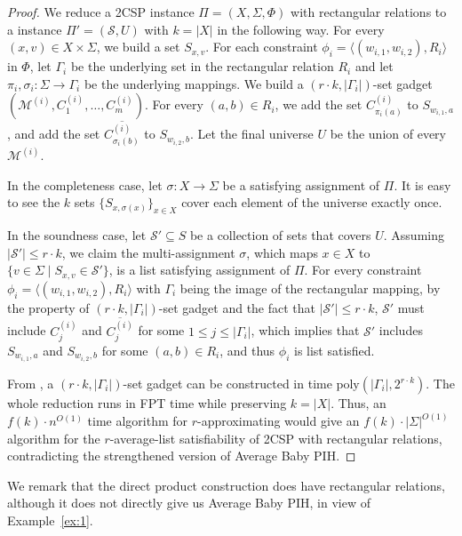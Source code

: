 \begin{proof}
We reduce a 2CSP instance $\Pi=(X,\Sigma,\Phi)$ with rectangular relations to a \ksetcover{} instance $\Pi'=(\mathcal S,U)$ with $k=|X|$ in the following way. For every $(x,v) \in X \times \Sigma$, we build a set $S_{x,v}$. For each constraint $\phi_i=\langle (w_{i,1},w_{i,2}),R_i\rangle$ in $\Phi$, let $\Gamma_i$ be the underlying set in the rectangular relation $R_i$ and let $\pi_i,\sigma_i:\Sigma\to \Gamma_i$ be the underlying mappings. We build a $(r \cdot k,|\Gamma_i|)$-set gadget $(\mathcal M^{(i)},C_1^{(i)},\ldots,C_m^{(i)})$. For every $(a,b) \in R_i$, we add the set $C_{\pi_i(a)}^{(i)}$ to $S_{w_{i,1},a}$, and add the set $\overline{C_{\sigma_i(b)}^{(i)}}$ to $S_{w_{i,2},b}$. Let the final universe $U$ be the union of every $\mathcal M^{(i)}$.


In the completeness case, let $\sigma:X \to \Sigma$ be a satisfying assignment of $\Pi$. It is easy to see the $k$ sets $\{S_{x,\sigma(x)}\}_{x \in X}$ cover each element of the universe exactly once.

In the soundness case, let $\mathcal S' \subseteq S$ be a collection of sets that covers $U$. Assuming $|\mathcal S'| \le r \cdot k$, we claim the multi-assignment $\sigma$, which maps $x \in X$ to $\{v \in \Sigma \mid S_{x,v} \in \mathcal S'\}$, is a list satisfying assignment of $\Pi$. For every constraint $\phi_i=\langle (w_{i,1},w_{i,2}),R_i\rangle$ with $\Gamma_i$ being the image of the rectangular mapping, by the property of $(r\cdot k,|\Gamma_i|)$-set gadget and the fact that $|\mathcal S'|\le r \cdot k$, $\mathcal S'$ must include $C_{j}^{(i)}$ and $\overline{C_j^{(i)}}$ for some $1 \le j \le |\Gamma_i|$, which implies that $\mathcal S'$ includes $S_{w_{i,1},a}$ and $S_{w_{i,2},b}$ for some $(a,b) \in R_i$, and thus $\phi_i$ is list satisfied.


From , a $(r\cdot k,|\Gamma_i|)$-set gadget can be constructed in time $\text{poly}(|\Gamma_i|,2^{r \cdot k})$. The whole reduction runs in FPT time while preserving $k=|X|$. Thus, an $f(k)\cdot n^{O(1)}$ time algorithm for $r$-approximating \kexact{} would give an $f(k)\cdot |\Sigma|^{O(1)}$ algorithm for the $r$-average-list satisfiability of 2CSP with rectangular relations, contradicting the strengthened version of Average Baby PIH.
\end{proof}

We remark that the direct product construction does have rectangular relations, although it does not directly give us Average Baby PIH, in view of Example~\ref{ex:1}.
